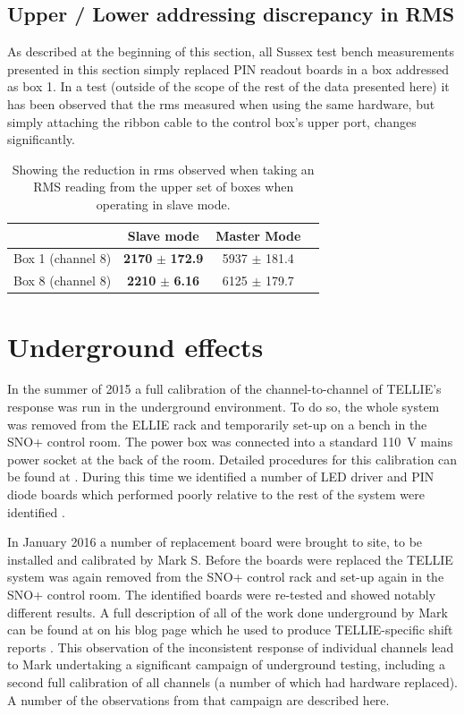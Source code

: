 \documentclass[12pt]{report}
\begin{document}
\subsection{Upper / Lower addressing discrepancy in RMS}
As described at the beginning of this section, all Sussex test bench measurements presented in this section simply replaced PIN readout boards in a box addressed as box 1. In a test (outside of the scope of the rest of the data presented here) it has been observed that the rms measured when using the same hardware, but simply attaching the ribbon cable to the control box’s upper port, changes significantly.

\begin{table}[t]
	\centering
	\begin{tabular}{| c | c | c | c |}
		\hline                        
		& Slave mode & Master Mode \\ \hline \hline
		Box 1 (channel 8) & \textbf{2170} $\pm$ \textbf{172.9}  & 5937 $\pm$ 181.4 \\ \hline
		Box 8 (channel 8) & \textbf{2210} $\pm$ \textbf{6.16}   & 6125 $\pm$ 179.7 \\ \hline
	\end{tabular}
	\caption{Showing the reduction in rms observed when taking an RMS reading from the upper set of boxes when operating in slave mode.}
	\label{tab:PinAdressing} 
\end{table}

\section{Underground effects}
In the summer of 2015 a full calibration of the channel-to-channel of TELLIE's response was run in the underground environment. To do so, the whole system was removed from the ELLIE rack and temporarily set-up on a bench in the SNO+ control room. The power box was connected into a standard 110~V mains power socket at the back of the room. Detailed procedures for this calibration can be found at \cite{tellieCalibProceedures}. During this time we identified a number of LED driver and PIN diode boards which performed poorly relative to the rest of the system were identified \cite{aug2015CalibSummary}. 

In January 2016 a number of replacement board were brought to site, to be installed and calibrated by Mark S. Before the boards were replaced the TELLIE system was again removed from the SNO+ control rack and set-up again in the SNO+ control room. The identified boards were re-tested and showed notably different results. A full description of all of the work done underground by Mark can be found at on his blog page which he used to produce TELLIE-specific shift reports \cite{StringerBlog}. This observation of the inconsistent response of individual channels lead to Mark undertaking a significant campaign of underground testing, including a second full calibration of all channels (a number of which had hardware replaced). A number of the observations from that campaign are described here.
\end{document}
